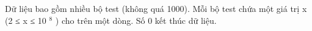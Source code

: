 Dữ liệu bao gồm nhiều bộ test (không quá 1000). Mỗi bộ test chứa một giá trị x (2 ≤ x ≤ 10   $^    8   $   ) cho trên một dòng. Số 0 kết thúc dữ liệu.  

\